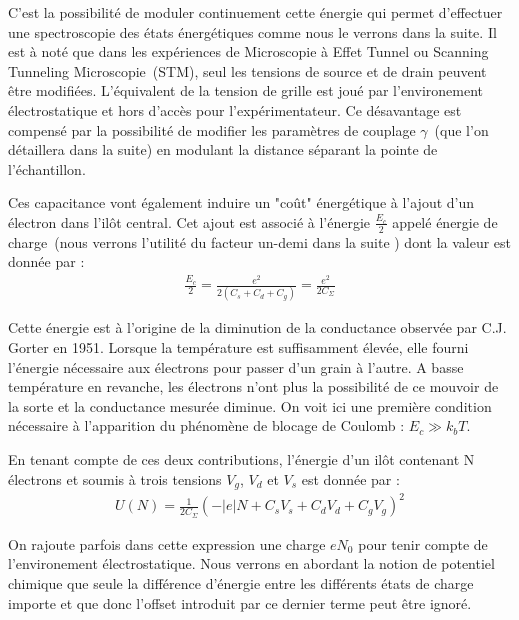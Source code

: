 C'est la possibilité de moduler continuement cette énergie qui permet d'effectuer une spectroscopie des états énergétiques comme nous le verrons dans la suite. Il est à noté que dans les expériences de Microscopie à Effet Tunnel ou Scanning Tunneling Microscopie~(STM), seul les tensions de source et de drain peuvent \^etre modifiées. L'équivalent de la tension de grille est joué par l'environement électrostatique et hors d'accès pour l'expérimentateur. Ce désavantage est compensé par la possibilité de modifier les paramètres de couplage $\gamma$~(que l'on détaillera dans la suite) en modulant la distance séparant la pointe de l'échantillon.

Ces capacitance vont également induire un "co\^ut" énergétique à l'ajout d'un électron dans l'il\^ot central. Cet ajout est associé à l'énergie $\frac{E_c}{2}$ appelé énergie de charge~(nous verrons l'utilité du facteur un-demi dans la suite ) dont la valeur est donnée par :
\begin{eqnarray}
\frac{E_c}{2} = \frac{e^2}{2(C_s+C_d+C_g)}=\frac{e^2}{2C_{\Sigma}} \nonumber
\end{eqnarray}


Cette énergie est à l'origine de la diminution de la conductance observée par C.J. Gorter en 1951. Lorsque la température est suffisamment élevée, elle fourni l'énergie nécessaire aux électrons pour passer d'un grain à l'autre. A basse température en revanche, les électrons n'ont plus la possibilité de ce mouvoir de la sorte et la conductance mesurée diminue. On voit ici une première condition nécessaire à l'apparition du phénomène de blocage de Coulomb : $E_c \gg k_bT$.

En tenant compte de ces deux contributions, l'énergie d'un il\^ot contenant N électrons et soumis à trois tensions $V_g$, $V_d$ et $V_s$ est donnée par :
\begin{eqnarray}
U(N) = \frac{1}{2C_{\Sigma}} (-|e|N + C_sV_s + C_dV_d + C_gV_g)^2
\end{eqnarray}

On rajoute parfois dans cette expression une charge $eN_0$ pour tenir compte de l'environement électrostatique. Nous verrons en abordant la notion de potentiel chimique que seule la différence d'énergie entre les différents états de charge importe et que donc l'offset introduit par ce dernier terme peut \^etre ignoré.


